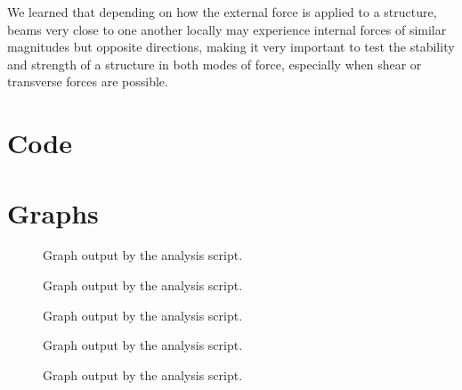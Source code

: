 \documentclass[12 pt]{report}
\begin{document}
We learned that depending on how the external force is applied to a structure, beams very close to one another locally may experience internal forces of similar magnitudes but opposite directions, making it very important to test the stability and strength of a structure in both modes of force, especially when shear or transverse forces are possible.

\printbibliography[heading=subbibintoc]
\appendix
\chapter{Code} \label{code}


\chapter{Graphs} \label{graphs}
\begin{figure}[htbp]
	\centering
	
	\caption{Graph output by the analysis script.}
	\label{fig:force-vs-time-test-1-run-1}
\end{figure}

\begin{figure}[htbp]
	\centering
	
	\caption{Graph output by the analysis script.}
	\label{fig:force-vs-time-test-1-run-2}
\end{figure}

\begin{figure}[htbp]
	\centering
	
	\caption{Graph output by the analysis script.}
	\label{fig:force-vs-time-test-1-run-3}
\end{figure}

\begin{figure}[htbp]
	\centering
	
	\caption{Graph output by the analysis script.}
	\label{fig:force-vs-time-test-1-run-4}
\end{figure}

\begin{figure}[htbp]
	\centering
	
	\caption{Graph output by the analysis script.}
	\label{fig:force-vs-time-test-1-run-5}
\end{figure}
\end{document}
